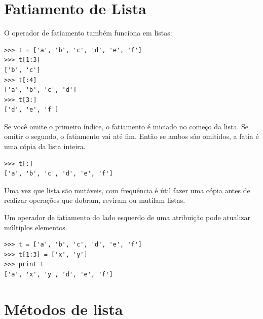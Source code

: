\section{Fatiamento de Lista}


O operador de fatiamento também funciona em listas:

\beforeverb
\begin{verbatim}
>>> t = ['a', 'b', 'c', 'd', 'e', 'f']
>>> t[1:3]
['b', 'c']
>>> t[:4]
['a', 'b', 'c', 'd']
>>> t[3:]
['d', 'e', 'f']
\end{verbatim}
\afterverb
%
Se você omite o primeiro índice, o fatiamento é iniciado no começo da lista.
Se omitir o segundo, o fatiamento vai até fim. Então se ambos são omitidos,
a fatia é uma cópia da lista inteira.



\beforeverb
\begin{verbatim}
>>> t[:]
['a', 'b', 'c', 'd', 'e', 'f']
\end{verbatim}
\afterverb
%
Uma vez que lista são mutáveis, com frequência é útil fazer uma cópia
antes de realizar operações que dobram, reviram ou mutilam listas.



Um operador de fatiamento do lado esquerdo de uma atribuição pode atualizar múltiplos elementos.


\beforeverb
\begin{verbatim}
>>> t = ['a', 'b', 'c', 'd', 'e', 'f']
>>> t[1:3] = ['x', 'y']
>>> print t
['a', 'x', 'y', 'd', 'e', 'f']
\end{verbatim}
\afterverb
%

\section{Métodos de lista}

